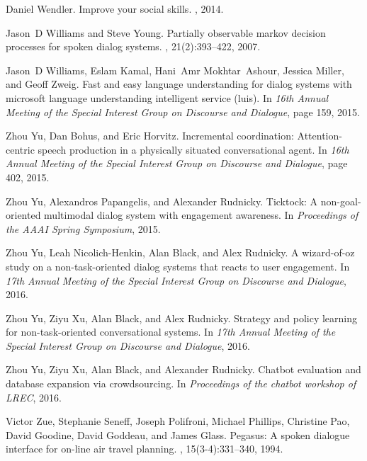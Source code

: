 \documentclass[11pt]{article}
\begin{document}
\begin{thebibliography}{}
Daniel Wendler.
\newblock Improve your social skills.
, 2014.

Jason~D Williams and Steve Young.
\newblock Partially observable markov decision processes for spoken dialog
  systems.
, 21(2):393--422, 2007.

Jason~D Williams, Eslam Kamal, Hani~Amr Mokhtar~Ashour, Jessica Miller, and
  Geoff Zweig.
\newblock Fast and easy language understanding for dialog systems with
  microsoft language understanding intelligent service (luis).
\newblock In {\em 16th Annual Meeting of the Special Interest Group on
  Discourse and Dialogue}, page 159, 2015.

Zhou Yu, Dan Bohus, and Eric Horvitz.
\newblock Incremental coordination: Attention-centric speech production in a
  physically situated conversational agent.
\newblock In {\em 16th Annual Meeting of the Special Interest Group on
  Discourse and Dialogue}, page 402, 2015.

Zhou Yu, Alexandros Papangelis, and Alexander Rudnicky.
\newblock Ticktock: A non-goal-oriented multimodal dialog system with
  engagement awareness.
\newblock In {\em Proceedings of the AAAI Spring Symposium}, 2015.

Zhou Yu, Leah Nicolich-Henkin, Alan Black, and Alex Rudnicky.
\newblock A wizard-of-oz study on a non-task-oriented dialog systems that
  reacts to user engagement.
\newblock In {\em 17th Annual Meeting of the Special Interest Group on
  Discourse and Dialogue}, 2016.

Zhou Yu, Ziyu Xu, Alan Black, and Alex Rudnicky.
\newblock Strategy and policy learning for non-task-oriented conversational
  systems.
\newblock In {\em 17th Annual Meeting of the Special Interest Group on
  Discourse and Dialogue}, 2016.

Zhou Yu, Ziyu Xu, Alan Black, and Alexander Rudnicky.
\newblock Chatbot evaluation and database expansion via crowdsourcing.
\newblock In {\em Proceedings of the chatbot workshop of LREC}, 2016.

Victor Zue, Stephanie Seneff, Joseph Polifroni, Michael Phillips, Christine
  Pao, David Goodine, David Goddeau, and James Glass.
\newblock Pegasus: A spoken dialogue interface for on-line air travel planning.
, 15(3-4):331--340, 1994.

\end{thebibliography}
\end{document}
